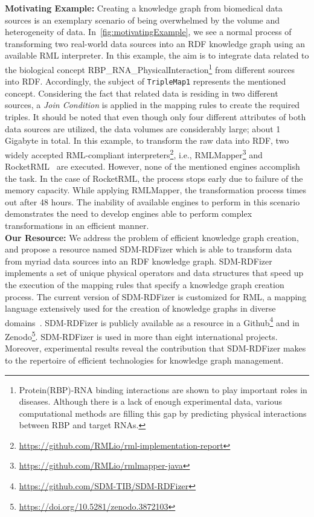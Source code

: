 \noindent \textbf{Motivating Example:}
Creating a knowledge graph from biomedical data sources is an exemplary scenario of being overwhelmed by the volume and heterogeneity of data. 
In~\autoref{fig:motivatingExample}, we see a normal process of transforming two real-world data sources into an RDF knowledge graph using an available RML interpreter. 
In this example, the aim is to integrate data related to the biological concept RBP\_RNA\_PhysicalInteraction\footnote{Protein(RBP)-RNA binding interactions are shown to play important roles in diseases.
Although there is a lack of enough experimental data, various computational methods are filling this gap by predicting physical interactions between RBP and target RNAs.} from different sources into RDF. 
Accordingly, the subject of \texttt{TripleMap1} represents the mentioned concept. 
Considering the fact that related data is residing in two different sources, a \textit{Join Condition} is applied in the mapping rules to create the required triples. 
It should be noted that even though only four different attributes of both data sources are utilized, the data volumes are considerably large; about 1 Gigabyte in total. 
In this example, to transform the raw data into RDF, two widely accepted RML-compliant interpreters\footnote{\url{https://github.com/RMLio/rml-implementation-report}}, i.e., RMLMapper\footnote{\url{https://github.com/RMLio/rmlmapper-java}} and RocketRML~\citep{csimcsek2019rocketrml} are executed. 
However, none of the mentioned engines accomplish the task. 
In the case of RocketRML, the process stops early due to failure of the memory capacity. 
While applying RMLMapper, the transformation process times out after 48 hours. 
The inability of available engines to perform in this scenario demonstrates the need to develop engines able to perform complex transformations in an efficient manner.
\\
\textbf{Our Resource:} We address the problem of efficient knowledge graph creation, and propose a resource named SDM-RDFizer which is able to transform data from myriad data sources into an RDF knowledge graph. SDM-RDFizer implements a set of unique physical operators and data structures that speed up the execution of the mapping rules that specify a knowledge graph creation process. The current version of SDM-RDFizer is customized for RML, a mapping language extensively used for the creation of knowledge graphs in diverse domains~\citep{DimouSCVMW14}.    
SDM-RDFizer is publicly available as a resource in a Github\footnote{\url{https://github.com/SDM-TIB/SDM-RDFizer}} and in Zenodo\footnote{\url{https://doi.org/10.5281/zenodo.3872103}}. SDM-RDFizer is used in more than eight international projects. Moreover, experimental results reveal the contribution that SDM-RDFizer makes to the repertoire of efficient technologies for knowledge graph management.  \\
